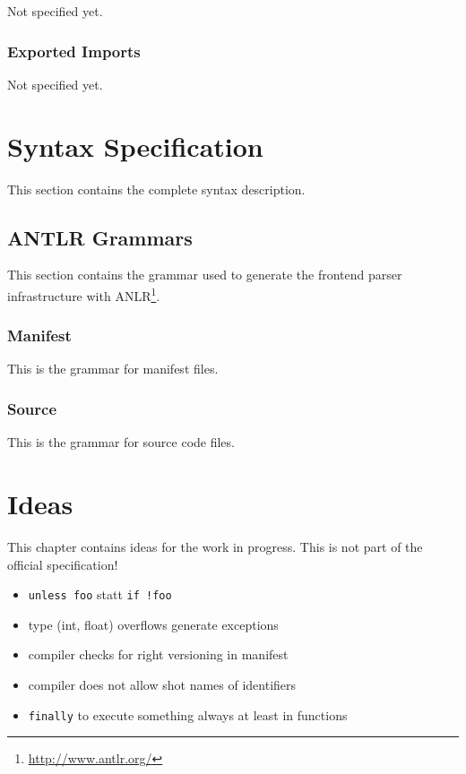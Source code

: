 \documentclass[11pt,a4paper]{report}
\begin{document}
Not specified yet.

\subsection{Exported Imports}

Not specified yet.

\chapter{Syntax Specification}

This section contains the complete syntax description.

\section{ANTLR Grammars}

This section contains the grammar used to generate the frontend parser infrastructure with ANLR\footnote{\url{http://www.antlr.org/}}.

\subsection{Manifest}

This is the grammar for manifest files.



\subsection{Source}

This is the grammar for source code files.



\chapter{Ideas}


This chapter contains ideas for the work in progress. This is not part of the official specification!

\begin{itemize}
    \item \texttt{unless foo} statt \texttt{if !foo}
    \item type (int, float) overflows generate exceptions
    \item compiler checks for right versioning in manifest
    \item compiler does not allow shot names of identifiers
    \item \texttt{finally} to execute something always at least in functions
\end{itemize}
\end{document}
